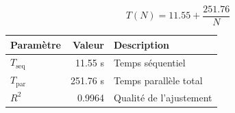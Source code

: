 \begin{equation}
\boxed{T(N) = 11.55 + \frac{251.76}{N}}
\end{equation}

\begin{table}[h]
\centering
\begin{tabular}{lrl}
\toprule
Paramètre & Valeur & Description \\
\midrule
$T_{\text{seq}}$ & 11.55 s & Temps séquentiel \\
$T_{\text{par}}$ & 251.76 s & Temps parallèle total \\
$R^2$ & 0.9964 & Qualité de l'ajustement \\
\bottomrule
\end{tabular}
\end{table}

